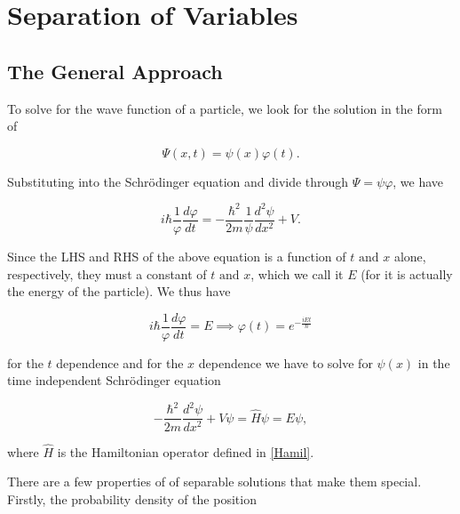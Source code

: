 \documentclass[a4paper,12pt]{report}
\begin{document}

\chapter{Separation of Variables}

\section{The General Approach}

To solve for the wave function of a particle, we look for the solution in the form of 

\begin{equation}
  \Psi (x,t) = \psi (x)\varphi (t).
\end{equation}

Substituting into the Schrödinger equation and divide through \(\Psi = \psi \varphi\), we have

\begin{equation}
  i \hbar \frac{1}{\varphi } \frac{d\varphi }{dt} = -\frac{\hbar ^2}{2m} \frac{1}{\psi } \frac{d^2\psi }{dx^2} + V.    
\end{equation}

Since the LHS and RHS of the above equation is a function of \(t \text { and } x\) alone, respectively, they must a constant of \(t \text { and } x\), which we call it \(E\) (for it is actually the energy of the particle). We thus have

\begin{equation}
  i \hbar \frac{1}{\varphi } \frac{d\varphi }{dt} = E \implies \varphi (t) = e^{-\frac{iEt}{\hbar } }  
\end{equation}

for the \(t\) dependence and for the \(x\) dependence we have to solve for \(\psi (x)\) in the time independent Schrödinger equation

\begin{equation}
  - \frac{\hbar ^2}{2m} \frac{d^2\psi }{dx^2} + V\psi = \hat{H}\psi = E\psi, \label{psix} 
\end{equation}

where \(\hat{H}\) is the Hamiltonian operator defined in \cref{Hamil}.

There are a few properties of of separable solutions that make them special. Firstly, the probability density of the position 
\end{document}
